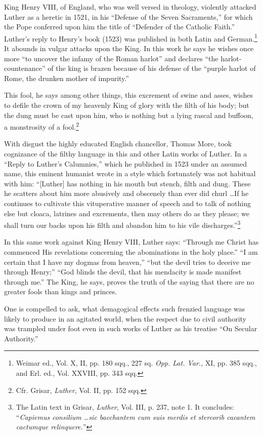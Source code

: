 King Henry VIII, of England, who was well versed in theology, violently
attacked Luther as a heretic in 1521, in his ``Defense of
the Seven Sacraments,'' for which the Pope conferred upon him the
title of ``Defender of the Catholic Faith.'' Luther's reply to Henry's
book (1523) was published in both Latin and German.\footnote
{Weimar ed., Vol. X, II, pp. 180 sqq., 227 sq. \textit{Opp. Lat. Var.}, XI, pp. 385 sqq., and
Erl. ed., Vol. XXVIII, pp. 343 sqq. }
It abounds
in vulgar attacks upon the King. In this work he says he wishes
once more ``to uncover the infamy of the Roman harlot'' and declares
``the harlot-countenance'' of the king is brazen because of his
defense of the ``purple harlot of Rome, the drunken mother of impurity.''

This fool, he says among other things, this excrement of swine and asses,
wishes to defile the crown of my heavenly King of glory with the filth of
his body; but the dung must be cast upon him, who is nothing but a lying
rascal and buffoon, a monstrosity of a fool.\footnote{Cfr. Grisar, \textit{Luther}, Vol. II, pp. 152 sqq. }

With disgust the highly educated English chancellor, Thomas More, took
cognizance of the filthy language in this and other Latin works of Luther.
In a ``Reply to Luther's Calumnies,'' which he published in 1523 under an
assumed name, this eminent humanist wrote in a style which fortunately
was not habitual with him: ``[Luther] has nothing in his mouth but stench,
filth and dung. These he scatters about him more abusively and obscenely
than ever did churl \dots If he continues to cultivate this vituperative manner
of speech and to talk of nothing else but cloaca, latrines and excrements,
then may others do as they please; we shall turn our backs upon his filth
and abandon him to his vile discharges.''\footnote
{The Latin text in Grisar, \textit{Luther}, Vol. III, p. 237, note 1. It concludes: “\textit{Capiemus
consilium \dots sic bacchantem cum suis merdis et stercorib cacantem cactumque
relinquere.}”}

In this same work against King Henry VIII, Luther says: “Through me
Christ has commenced His revelations concerning the abominations in the holy
place.” “I am certain that I have my dogmas from heaven,” “but the devil
tries to deceive me through Henry;” “God blinds the devil, that his mendacity
is made manifest through me.” The King, he says, proves the truth
of the saying that there are no greater fools than kings and princes.

One is compelled to ask, what demagogical effects such frenzied
language was likely to produce in an agitated world, when the
respect due to civil authority was trampled under foot even in such
works of Luther as his treatise “On Secular Authority.”

